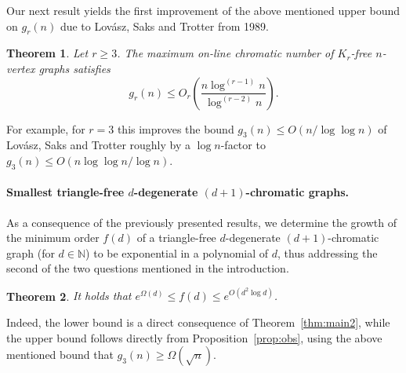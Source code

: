 \documentclass[10pt]{amsart}
\newtheorem{theorem}{Theorem}[section]
\theoremstyle{definition}
\begin{document}
Our next result yields the first improvement of the above mentioned upper bound on $g_r(n)$ due to Lov\'{a}sz, Saks and Trotter from 1989.
\begin{theorem}\label{thm:jacob}
Let $r\ge 3$. The maximum on-line chromatic number of $K_r$-free $n$-vertex graphs satisfies 
$$g_r(n)\le O_r\left(\frac{n \log^{(r-1)} n}{\log^{(r-2)} n}\right).$$
\end{theorem}
For example, for $r=3$ this improves the bound $g_3(n)\le O(n/\log\log n)$ of Lov\'{a}sz, Saks and Trotter roughly by a $\log n$-factor to $g_3(n)\le O(n\log\log n/\log n)$.

\paragraph*{\textbf{Smallest triangle-free $d$-degenerate $(d+1)$-chromatic graphs.}} As a consequence of the previously presented results, we determine the growth of the minimum order $f(d)$ of a triangle-free $d$-degenerate $(d+1)$-chromatic graph (for $d\in \mathbb{N}$) to be exponential in a polynomial of $d$, thus addressing the second of the two questions mentioned in the introduction.

\begin{theorem}\label{thm:main1}
    It holds that $e^{\Omega(d)}\le f(d)\le e^{O(d^2\log d)}$.
\end{theorem}

Indeed, the lower bound is a direct consequence of Theorem~\ref{thm:main2}, while the upper bound follows directly from Proposition~\ref{prop:obs}, using the above mentioned bound that $g_3(n)\ge \Omega(\sqrt{n})$. 
\end{document}
